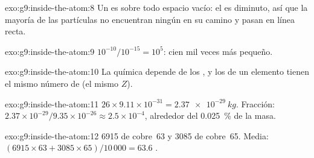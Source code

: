 \begin{solution}{exo:g9:inside-the-atom:8}
Un  es sobre todo espacio vacío: el  es diminuto, así que la
mayoría de las partículas no encuentran ningún  en su camino y
pasan en línea recta.
\end{solution}

\begin{solution}{exo:g9:inside-the-atom:9}
$10^{-10} / 10^{-15} = 10^{5}$: cien mil veces más pequeño.
\end{solution}

\begin{solution}{exo:g9:inside-the-atom:10}
La química depende de los , y los  de un elemento
tienen el mismo número de  (el mismo $Z$).
\end{solution}

\begin{solution}{exo:g9:inside-the-atom:11}
$26 \times 9.11 \times 10^{-31} = \qty{2.37e-29}{kg}$. Fracción:
$2.37 \times 10^{-29} / 9.35 \times 10^{-26} \approx 2.5 \times
10^{-4}$, alrededor del \qty{0.025}{\percent} de la masa.
\end{solution}

\begin{solution}{exo:g9:inside-the-atom:12}
6915  de cobre~63 y 3085  de cobre~65. Media:
$(6915 \times 63 + 3085 \times 65)/10\,000 = 63.6$ .
\end{solution}

